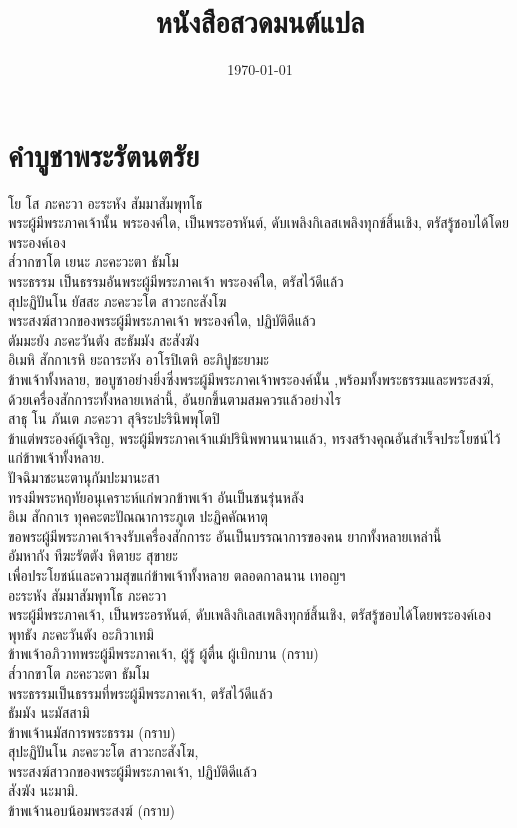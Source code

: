 \documentclass{article}
\title{หนังสือสวดมนต์แปล}
\date{\today}
\begin{document}
\pagecolor{lightyellow}
\maketitle
\newpage
\tableofcontents

\pagebreak
\section{คำบูชาพระรัตนตรัย}
โย โส ภะคะวา อะระหัง สัมมาสัมพุทโธ\\
\indent พระผู้มีพระภาคเจ้านั้น พระองค์ใด, เป็นพระอรหันต์, 
ดับเพลิงกิเลสเพลิงทุกข์สิ้นเชิง, ตรัสรู้ชอบได้โดยพระองค์เอง\\
ส๎วากขาโต เยนะ ภะคะวะตา ธัมโม \\
\indent พระธรรม เป็นธรรมอันพระผู้มีพระภาคเจ้า พระองค์ใด, ตรัสไว้ดีแล้ว\\
สุปะฏิปันโน ยัสสะ ภะคะวะโต สาวะกะสังโฆ\\
\indent พระสงฆ์สาวกของพระผู้มีพระภาคเจ้า พระองค์ใด, ปฏิบัติดีแล้ว\\
ตัมมะยัง ภะคะวันตัง สะธัมมัง สะสังฆัง\\
อิเมหิ สักกาเรหิ ยะถาระหัง อาโรปิเตหิ อะภิปูชะยามะ\\
\indent ข้าพเจ้าทั้งหลาย, ขอบูชาอย่างยิ่งซึ่งพระผู้มีพระภาคเจ้าพระองค์นั้น
,พร้อมทั้งพระธรรมและพระสงฆ์,
ด้วยเครื่องสักการะทั้งหลายเหล่านี้, อันยกขึ้นตามสมควรแล้วอย่างไร\\
สาธุ โน ภันเต ภะคะวา สุจิระปะรินิพพุโตปิ\\
\indent ข้าแต่พระองค์ผู้เจริญ, พระผู้มีพระภาคเจ้าแม้ปรินิพพานนานแล้ว,
ทรงสร้างคุณอันสำเร็จประโยชน์ไว้แก่ข้าพเจ้าทั้งหลาย.\\
ปัจฉิมาชะนะตานุกัมปะมานะสา\\
\indent ทรงมีพระหฤทัยอนุเคราะห์แก่พวกข้าพเจ้า อันเป็นชนรุ่นหลัง\\
อิเม สักกาเร ทุคคะตะปัณณาการะภูเต ปะฏิคคัณหาตุ\\
\indent ขอพระผู้มีพระภาคเจ้าจงรับเครื่องสักการะ อันเป็นบรรณาการของคน
ยากทั้งหลายเหล่านี้\\
อัมหากัง ทีฆะรัตตัง หิตายะ สุขายะ\\
\indent เพื่อประโยชน์และความสุขแก่ข้าพเจ้าทั้งหลาย ตลอดกาลนาน เทอญฯ\\
อะระหัง สัมมาสัมพุทโธ ภะคะวา\\
\indent พระผู้มีพระภาคเจ้า, เป็นพระอรหันต์, ดับเพลิงกิเลสเพลิงทุกข์สิ้นเชิง,
ตรัสรู้ชอบได้โดยพระองค์เอง\\
พุทธัง ภะคะวันตัง อะภิวาเทมิ\\
\indent ข้าพเจ้าอภิวาทพระผู้มีพระภาคเจ้า, ผู้รู้ ผู้ตื่น ผู้เบิกบาน (กราบ)\\
ส๎วากขาโต ภะคะวะตา ธัมโม \\
\indent พระธรรมเป็นธรรมที่พระผู้มีพระภาคเจ้า, ตรัสไว้ดีแล้ว\\
ธัมมัง นะมัสสามิ\\
\indent ข้าพเจ้านมัสการพระธรรม (กราบ)\\
สุปะฏิปันโน ภะคะวะโต สาวะกะสังโฆ,\\
\indent พระสงฆ์สาวกของพระผู้มีพระภาคเจ้า, ปฏิบัติดีแล้ว\\
สังฆัง นะมามิ.\\
\indent ข้าพเจ้านอบน้อมพระสงฆ์ (กราบ)
\end{document}
